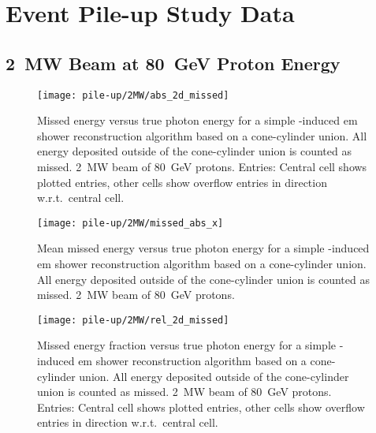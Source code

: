 \chapter{  Event Pile-up Study Data}
\label{chap:pile-up-data}

\section{\SI{2}{\mega\watt} Beam at \SI{80}{\giga\electronvolt} Proton Energy}

\begin{figure}[htbp]
	\centering
	\texttt{[image: pile-up/2MW/abs\_2d\_missed]}
	\caption[Pile-up study missed vs.\ true photon energy, \SI{2}{\mega\watt} beam]{%
		Missed energy versus true photon energy for a simple \Pgpz-induced \acrshort{em} shower reconstruction algorithm based on a cone-cylinder union.
		All energy deposited outside of the cone-cylinder union is counted as missed.
		\SI{2}{\mega\watt} beam of \SI{80}{\giga\electronvolt} protons.
		Entries: Central cell shows plotted entries, other cells show overflow entries in direction w.r.t.\ central cell.
	}
\end{figure}

\begin{figure}[tbp]
	\centering
	\texttt{[image: pile-up/2MW/missed\_abs\_x]}
	\caption[Pile-up study mean missed vs.\ true photon energy, \SI{2}{\mega\watt} beam]{%
		Mean missed energy versus true photon energy for a simple \Pgpz-induced \acrshort{em} shower reconstruction algorithm based on a cone-cylinder union.
		All energy deposited outside of the cone-cylinder union is counted as missed.
		\SI{2}{\mega\watt} beam of \SI{80}{\giga\electronvolt} protons.
	}
\end{figure}

\begin{figure}[tbp]
	\centering
	\texttt{[image: pile-up/2MW/rel\_2d\_missed]}
	\caption[Pile-up study missed fractional vs.\ true photon energy, \SI{2}{\mega\watt} beam]{%
		Missed energy fraction versus true photon energy for a simple \Pgpz-induced \acrshort{em} shower reconstruction algorithm based on a cone-cylinder union.
		All energy deposited outside of the cone-cylinder union is counted as missed.
		\SI{2}{\mega\watt} beam of \SI{80}{\giga\electronvolt} protons.
		Entries: Central cell shows plotted entries, other cells show overflow entries in direction w.r.t.\ central cell.
	}
\end{figure}

